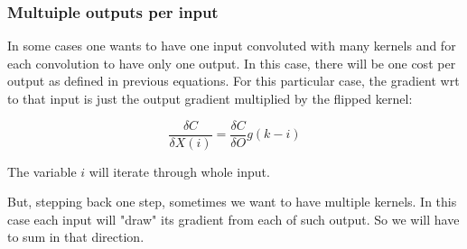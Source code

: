 \documentclass{article}
\begin{document}

\subsubsection{Multuiple outputs per input}

In some cases one wants to have one input convoluted with many kernels and for each convolution to have only one output. In this case, there will be one cost per output as defined in previous equations. For this particular case, the gradient wrt to that input is just the output gradient multiplied by the flipped kernel:

\begin{equation}
	\frac{\delta C}{\delta X(i)} = \frac{\delta C}{\delta O}g(k-i)
\end{equation}

The variable $i$ will iterate through whole input.

But, stepping back one step, sometimes we want to have multiple kernels. In this case each input will "draw" its gradient from each of such output. So we will have to sum in that direction.
	
\end{document}
